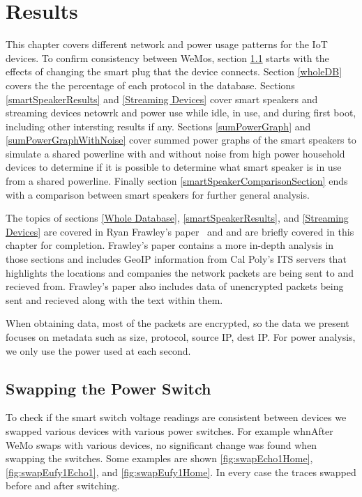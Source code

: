 \chapter{Results}
\label{Results}
This chapter covers different network and power usage patterns for the IoT devices. To confirm consistency between WeMos, section \ref{swappingSwitch} starts with the effects of changing the smart plug that the device connects. Section \ref{wholeDB} covers the the percentage of each protocol in the database. Sections \ref{smartSpeakerResults} and \ref{Streaming Devices} cover smart speakers and streaming devices netowrk and power use while idle, in use, and during first boot, including other intersting results if any. Sections \ref{sumPowerGraph} and \ref{sumPowerGraphWithNoise} cover summed power graphs of the smart speakers to simulate a shared powerline with and without noise from high power household devices to determine if it is possible to determine what smart speaker is in use from a shared powerline. Finally section \ref{smartSpeakerComparisonSection} ends with a comparison between smart speakers for further general analysis.

The topics of sections \ref{Whole Database}, \ref{smartSpeakerResults}, and \ref{Streaming Devices} are covered in Ryan Frawley's paper~\cite{frawley_2018} and and are briefly covered in this chapter for completion. Frawley's paper contains a more in-depth analysis in those sections and includes GeoIP \cite{maxmind} information from Cal Poly's ITS servers \cite{its} that highlights the locations and companies the network packets are being sent to and recieved from. Frawley's paper also includes data of unencrypted packets being sent and recieved along with the text within them.

When obtaining data, most of the packets are encrypted, so the data we present focuses on metadata such as size, protocol, source IP, dest IP. For power analysis, we only use the power used at each second.

\section{Swapping the Power Switch}
\label{swappingSwitch}
To check if the smart switch voltage readings are consistent between devices we swapped various devices with various power switches. For example whnAfter WeMo swaps with various devices, no significant change was found when swapping the switches. Some examples are shown \ref{fig:swapEcho1Home}, \ref{fig:swapEufy1Echo1}, and \ref{fig:swapEufy1Home}. In every case the traces swapped before and after switching.

